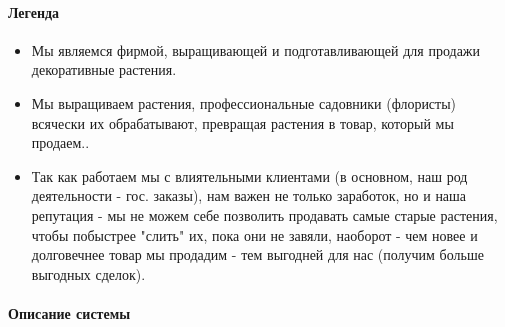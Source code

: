 \documentclass[a4paper, 14pt]{article}
\begin{document}
\paragraph{Легенда}

\begin{itemize}
	\item Мы являемся фирмой, выращивающей и подготавливающей для продажи декоративные растения.
	\item Мы выращиваем растения, профессиональные садовники (флористы) всячески их обрабатывают, превращая растения в товар, который мы продаем..
	\item Так как работаем мы с влиятельными клиентами (в основном, наш род деятельности - гос. заказы), нам важен не только заработок, но и наша репутация - мы не можем себе позволить продавать самые старые растения, чтобы побыстрее "слить" их, пока они не завяли, наоборот - чем новее и долговечнее товар мы продадим - тем выгодней для нас (получим больше выгодных сделок).
\end{itemize}

\paragraph{Описание системы}
\end{document}
